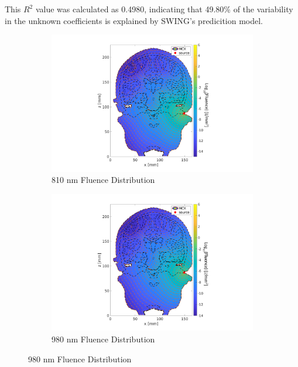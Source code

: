 \documentclass[journal,twoside,web]{ieeecolor}
\begin{document}
This $R^2$ value was calculated as 0.4980, indicating that 49.80\% of the variability in the unknown coefficients is 
explained by SWING's predicition model.

\begin{figure}[hbt!]
    \begin{subfigure}{.475\linewidth}
      \includegraphics[width=\linewidth]{Figures/Fluence_Distribution_810nm_Cochlear.png}
      \caption{810 nm Fluence Distribution}
      \label{MLEDdet}
    \end{subfigure}
    \hfill
    \begin{subfigure}{.5\linewidth}
      \includegraphics[width=\linewidth]{Figures/Fluence_Distribution_980nm_Cochlear.png}
      \caption{980 nm Fluence Distribution}
      \label{energydetPSK}
    \end{subfigure}
    

\end{figure}
\end{document}

